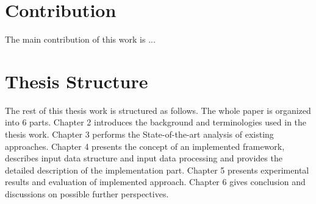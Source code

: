 \section{Contribution}

The main contribution of this work is ...

\section{Thesis Structure}

The rest of this thesis work is structured as follows. The whole paper is organized into 6 parts. Chapter 2 introduces the background and terminologies used in the thesis work. Chapter 3 performs the State-of-the-art analysis of existing approaches. Chapter 4 presents the concept of an implemented framework, describes input data structure and input data processing and provides the detailed description of the implementation part. Chapter 5 presents experimental results and evaluation of implemented approach. Chapter 6 gives conclusion and discussions on possible further perspectives.